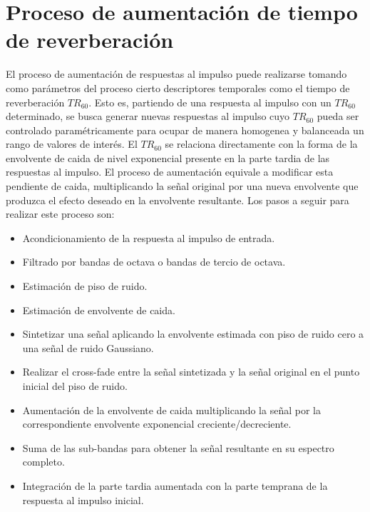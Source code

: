 \section{Proceso de aumentación de tiempo de reverberación}
El proceso de aumentación de respuestas al impulso puede realizarse tomando como parámetros del proceso cierto descriptores temporales como el tiempo de reverberación $TR_{60}$. Esto es, partiendo de una respuesta al impulso con un $TR_{60}$ determinado, se busca generar nuevas respuestas al impulso cuyo $TR_{60}$ pueda ser controlado paramétricamente para ocupar de manera homogenea y balanceada un rango de valores de interés. 
El $TR_{60}$ se relaciona directamente con la forma de la envolvente de caida de nivel exponencial presente en la parte tardia de las respuestas al impulso. El proceso de aumentación equivale a modificar esta pendiente de caida, multiplicando la señal original por una nueva envolvente que produzca el efecto deseado en la envolvente resultante. Los pasos a seguir para realizar este proceso son: 

\begin{itemize}
  \item Acondicionamiento de la respuesta al impulso de entrada.
  \item Filtrado por bandas de octava o bandas de tercio de octava.
  \item Estimación de piso de ruido.
  \item Estimación de envolvente de caida.
  \item Sintetizar una señal aplicando la envolvente estimada con piso de ruido cero a una señal de ruido Gaussiano. 
  \item Realizar el cross-fade entre la señal sintetizada y la señal original en el punto inicial del piso de ruido.
  \item Aumentación de la envolvente de caida multiplicando la señal por la correspondiente envolvente exponencial creciente/decreciente.
  \item Suma de las sub-bandas para obtener la señal resultante en su espectro completo.
  \item Integración de la parte tardia aumentada con la parte temprana de la respuesta al impulso inicial.
\end{itemize} 	


